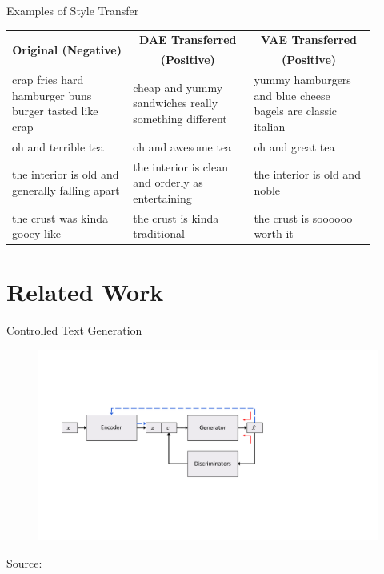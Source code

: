 \documentclass[aspectratio=169]{beamer}
\newcommand{\imgsrc}[1]{\tiny{Source: #1}}
\newcommand{\tabh}[1]{\multicolumn{1}{c|}{\textbf{#1}}}
\newcommand{\tabc}[2]{\multicolumn{1}{|c|}{\multirow{#1}{*}{\textbf{#2}}}}
\begin{document}
\begin{frame}{Examples of Style Transfer}
	\centering
	\begin{table}[ht]
		\centering
		\begin{tabular}{| p{0.3\linewidth} | p{0.3\linewidth} | p{0.3\linewidth} |}
			\hline
			\tabc{2}{Original (Negative)}                          & \tabh{DAE Transferred}                                & \tabh{VAE Transferred}                                      \\
			                                                       & \tabh{(Positive)}                                     & \tabh{(Positive)}                                           \\
			\hline
			\hline
			crap fries hard hamburger buns burger tasted like crap & cheap and yummy sandwiches really something different & yummy hamburgers and blue cheese bagels are classic italian \\
			\hline
			oh and terrible tea                                    & oh and awesome tea                                    & oh and great tea                                            \\
			\hline
			the interior is old and generally falling apart        & the interior is clean and orderly as entertaining     & the interior is old and noble                               \\
			\hline
			the crust was kinda gooey like                         & the crust is kinda traditional                        & the crust is soooooo worth it                               \\
			\hline
		\end{tabular}
	\end{table}
\end{frame}

% 

\section{Related Work}

\begin{frame}{Controlled Text Generation}
	\centering
	\begin{figure}[ht]
		\includegraphics[width=\textwidth]{images/tcg-architecture}
	\end{figure}
	\imgsrc{\citet{hu2017toward}}
\end{frame}
\end{document}
